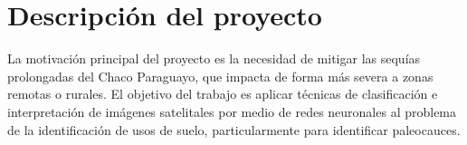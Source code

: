\section{Descripción del proyecto}

La motivación principal del proyecto es la necesidad de mitigar las sequías prolongadas del Chaco Paraguayo, que
impacta de forma más severa a zonas remotas o rurales. El objetivo del trabajo es aplicar técnicas de clasificación e
interpretación de imágenes satelitales por medio de redes neuronales al problema de la identificación de usos de suelo,
particularmente para identificar paleocauces.
